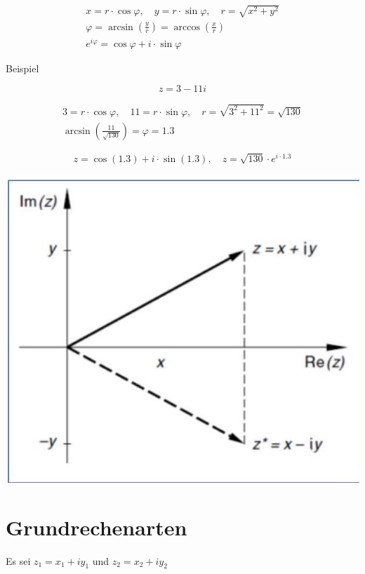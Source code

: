 \documentclass[10pt]{article}
\begin{document}
$$
\begin{gathered}
x=r \cdot \cos \varphi, \quad y=r \cdot \sin \varphi, \quad r=\sqrt{x^{2}+y^{2}} \\
\varphi=\arcsin \left(\frac{y}{r}\right)=\arccos \left(\frac{x}{r}\right) \\
e^{i \varphi}=\cos \varphi+i \cdot \sin \varphi
\end{gathered}
$$

Beispiel

$$
z=3-11 i
$$

$$
\begin{gathered}
3=r \cdot \cos \varphi, \quad 11=r \cdot \sin \varphi, \quad r=\sqrt{3^{2}+11^{2}}=\sqrt{130} \\
\arcsin \left(\frac{11}{\sqrt{130}}\right)=\varphi=1.3
\end{gathered}
$$

$$
z=\cos (1.3)+i \cdot \sin (1.3), \quad z=\sqrt{130} \cdot e^{i \cdot 1.3}
$$

\begin{center}
\includegraphics[max width=\textwidth]{2024_12_29_68ccba06d0091c162fa4g-11}
\end{center}

\section*{Grundrechenarten}
Es sei $z_{1}=x_{1}+i y_{1}$ und $z_{2}=x_{2}+i y_{2}$
\end{document}
